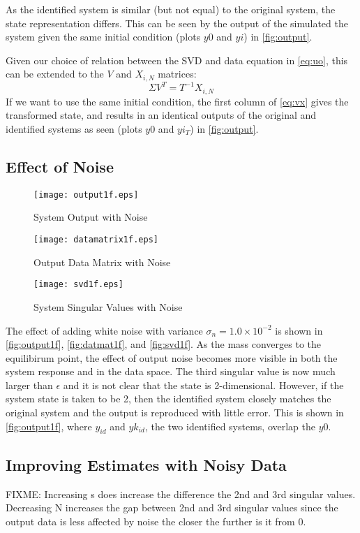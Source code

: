 \documentclass[11pt,a4paper]{article}
\begin{document}
As the identified system is similar (but not equal) to the original system, the
state representation differs. This can be seen by the output of the simulated
the system given the same initial condition (plots $y0$ and $yi$) in
\autoref{fig:output}.

Given our choice of relation between the SVD and data equation in
\autoref{eq:uo}, this can be extended to the $V$ and $X_{i, N}$ matrices:
\begin{equation}
    \label{eq:vx}
    \Sigma V^T = T^{-1} X_{i, N}
\end{equation}
If we want to use the same initial condition, the first column of
\autoref{eq:vx} gives the transformed state, and results in an identical
outputs of the original and identified systems as seen (plots $y0$ and $yi_T$)
in \autoref{fig:output}.

\subsection{Effect of Noise}
\begin{figure}
    \centering
    \texttt{[image: output1f.eps]}
    \caption{System Output with Noise}
    \label{fig:output1f}
\end{figure}
\begin{figure}
    \centering
    \texttt{[image: datamatrix1f.eps]}
    \caption{Output Data Matrix with Noise}
    \label{fig:datmat1f}
\end{figure}
\begin{figure}
    \centering
    \texttt{[image: svd1f.eps]}
    \caption{System Singular Values with Noise}
    \label{fig:svd1f}
\end{figure}
The effect of adding white noise with variance $\sigma_n = 1.0 \times 10^{-2}$
is shown in \autoref{fig:output1f}, \autoref{fig:datmat1f}, and
\autoref{fig:svd1f}. As the mass converges to the equilibirum point, the effect
of output noise becomes more visible in both the system response and in the
data space. The third singular value is now much larger than $\epsilon$ and it
is not clear that the state is 2-dimensional. However, if the system state is
taken to be 2, then the identified system closely matches the original system
and the output is reproduced with little error. This is shown in
\autoref{fig:output1f}, where $y_{id}$ and $yk_{id}$, the two identified
systems, overlap the $y0$.

\subsection{Improving Estimates with Noisy Data}
FIXME: Increasing s does increase the difference the 2nd and 3rd singular
values. Decreasing N increases the gap between 2nd and 3rd singular values
since the output data is less affected by noise the closer the further is it
from 0.
\end{document}
